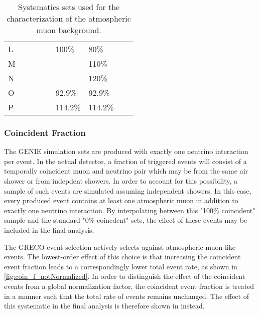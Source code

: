 \begin{landscape}
\begin{table}[]
\begin{tabular}{@{}lllllllll@{}}
L          &            &         &          &               & 100\%      & 80\%       &          &                                        \\
M          &            &         &          &               &                 & 110\%      &          &                                        \\
N          &            &         &          &               &                 & 120\%       &          &                                        \\
O          &            &         &          &               & 92.9\%     & 92.9\%     &          &                                        \\
P          &            &         &          &               & 114.2\%   & 114.2\%    &          &                                        \\ \bottomrule
\end{tabular}
\caption{Systematics sets used for the characterization of the atmospheric muon background.}
\label{table:mgsets}
\end{table}
\end{landscape}


\subsubsection{Coincident Fraction}
\label{subsubsec:coin_fraction}
The GENIE simulation sets are produced with exactly one neutrino interaction per event. 
In the actual detector, a fraction of triggered events will consist of a temporally coincident muon and neutrino pair which may be from the same air shower or from indepdent showers.
In order to account for this possibility, a sample of such events are simulated assuming independent showers.
In this case, every produced event contains at least one atmospheric muon in addition to exactly one neutrino interaction.
By interpolating between this "100\% coincident" sample and the standard "0\% coincdent" sets, the effect of these events may be included in the final analysis.

The GRECO event selection actively selects against atmospheric muon-like events.
The lowest-order effect of this choice is that increasing the coincident event fraction leads to a correspondingly lower total event rate, as shown in \ref{fig:coin_f_notNormalized}.
In order to distinguish the effect of the coincident events from a global normalization factor, the coincident event fraction is treated in a manner such that the total rate of events remains unchanged. 
The effect of this systematic in the final analysis is therefore shown in  instead.

